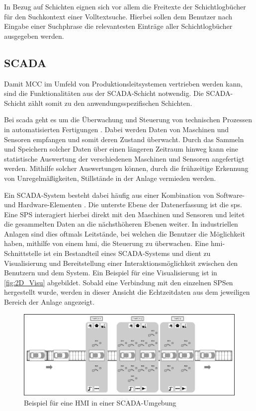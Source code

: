 In Bezug auf Schichten eignen sich vor allem die Freitexte der Schichtlogbücher für den Suchkontext einer Volltextsuche. Hierbei sollen dem Benutzer nach Eingabe einer Suchphrase die relevantesten Einträge aller Schichtlogbücher ausgegeben werden.

\subsection{SCADA\label{subsec3.1.3:Unterunterpunkt-3}}

Damit MCC im Umfeld von Produktionsleitsystemen vertrieben werden kann, sind die Funktionalitäten aus der \glqq SCADA\grqq{}-Schicht notwendig. Die \glqq SCADA\grqq{}-Schicht zählt somit zu den anwendungsspezifischen Schichten.

Bei \gls{scada} geht es um die Überwachung und Steuerung von technischen Prozessen in automatisierten Fertigungen \cite{ColeWangsness.2020}. Dabei werden Daten von Maschinen und Sensoren empfangen und somit deren Zustand überwacht. Durch das Sammeln und Speichern solcher Daten über einen längeren Zeitraum hinweg kann eine statistische Auswertung der verschiedenen Maschinen und Sensoren angefertigt werden. Mithilfe solcher Auswertungen können, durch die frühzeitige Erkennung von Unregelmäßigkeiten, Stillstände in der Anlage vermieden werden.

Ein SCADA-System besteht dabei häufig aus einer Kombination von Software- und Hardware-Elementen \cite{copadata.com.2021}. Die unterste Ebene der Datenerfassung ist die \gls{sps}. Eine SPS interagiert hierbei direkt mit den Maschinen und Sensoren und leitet die gesammelten Daten an die nächsthöheren Ebenen weiter. In industriellen Anlagen sind dies oftmals Leitstände, bei welchen die Benutzer die Möglichkeit haben, mithilfe von einem \gls{hmi}, die Steuerung zu überwachen. Eine \gls{hmi}-Schnittstelle ist ein Bestandteil eines SCADA-Systems und dient zu Visualisierung und Bereitstellung einer Interaktionsmöglichkeit zwischen den Benutzern und dem System. Ein Beispiel für eine Visualisierung ist in \autoref{fig:2D_Visu} abgebildet. Sobald eine Verbindung mit den einzelnen SPSen hergestellt wurde, werden in dieser Ansicht die Echtzeitdaten aus dem jeweiligen Bereich der Anlage angezeigt.

\begin{figure}[H]
    \centering
    \includegraphics[width=0.8\linewidth]{images/2D_Visu.png}
    \caption{Beispiel für eine HMI in einer SCADA-Umgebung}
    \label{fig:2D_Visu}
\end{figure}

